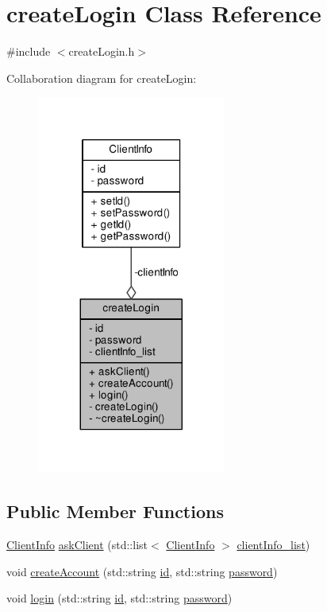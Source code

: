 \hypertarget{classcreate_login}{}\section{create\+Login Class Reference}
\label{classcreate_login}


{\ttfamily \#include $<$create\+Login.\+h$>$}



Collaboration diagram for create\+Login\+:
\nopagebreak
\begin{figure}[H]
\begin{center}
\leavevmode
\includegraphics[width=176pt]{classcreate_login__coll__graph}
\end{center}
\end{figure}
\subsection*{Public Member Functions}
\begin{DoxyCompactItemize}
\item 
\hyperlink{class_client_info}{Client\+Info} \hyperlink{classcreate_login_a564c74834f64e0af3d77a48611e6801b}{ask\+Client} (std\+::list$<$ \hyperlink{class_client_info}{Client\+Info} $>$ \hyperlink{classcreate_login_a5ea072e63025feb0343c502dbf821d1e}{client\+Info\+\_\+list})
\item 
void \hyperlink{classcreate_login_aecf7f6623c2f38e9f75093ac7c8128e7}{create\+Account} (std\+::string \hyperlink{classcreate_login_a0269d9bbbeaec3c108901f8a4a36665d}{id}, std\+::string \hyperlink{classcreate_login_aee8e305c94308da429f2f2e7c6d08370}{password})
\item 
void \hyperlink{classcreate_login_a6012395d12f24689de88dafd5917bf89}{login} (std\+::string \hyperlink{classcreate_login_a0269d9bbbeaec3c108901f8a4a36665d}{id}, std\+::string \hyperlink{classcreate_login_aee8e305c94308da429f2f2e7c6d08370}{password})
\end{DoxyCompactItemize}
